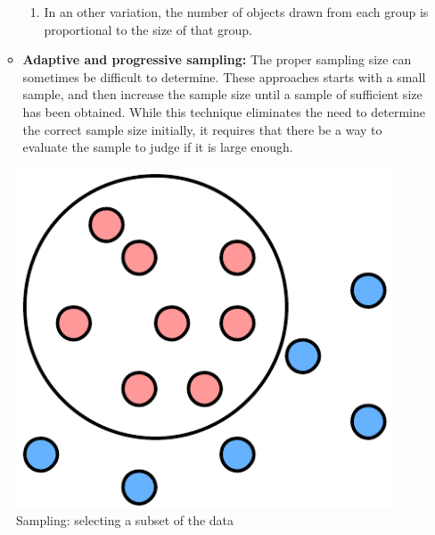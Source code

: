 \begin{itemize}
\begin{itemize}
\begin{enumerate}
							\item In an other variation, the number of objects drawn from each group 
							is proportional to the size of that group. 
						\end{enumerate} 
					\item {\bf Adaptive and progressive sampling:} The proper sampling size
					can sometimes be difficult to determine. These approaches starts with a 
					small sample, and then increase the sample size until a sample of sufficient
					size has been obtained. While this technique eliminates the need to determine
					the correct sample size initially, it requires that there be a way to evaluate
					the sample to judge if it is large enough.
				\end{itemize}			
		\end{itemize}

		\begin{figure}[H]
			\centering
			\includegraphics[scale=0.3]{pics/sampling.png}
			\caption{Sampling: selecting a subset of the data}
		\end{figure}

